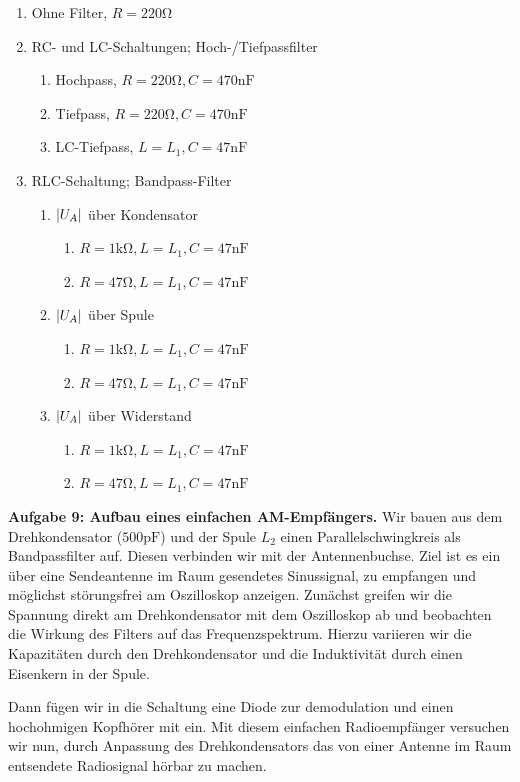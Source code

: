 \begin{multicols}{2}
  \begin{enumerate}[label=\arabic*.]
    \item Ohne Filter, $R = 220 \si{\ohm}$
    \item RC- und LC-Schaltungen; Hoch-/Tiefpassfilter
    \begin{enumerate}[label=\alph*)]
      \item Hochpass, $R = 220 \si{\ohm}, C = 470 \si{\nano\farad}$
      \item Tiefpass, $R = 220 \si{\ohm}, C = 470 \si{\nano\farad}$
      \item LC-Tiefpass, $L = L_1, C = 47 \si{\nano\farad}$
    \end{enumerate}
    \item RLC-Schaltung; Bandpass-Filter
    \begin{enumerate}[label=\alph*)]
      \item $\qty|U_A|$ über Kondensator
      \begin{enumerate}
        \item $R = 1 \si{\kilo\ohm}, L = L_1, C = 47 \si{\nano\farad}$
        \item $R = 47 \si{\ohm}, L = L_1, C = 47 \si{\nano\farad}$
      \end{enumerate}
      \item $\qty|U_A|$ über Spule
      \begin{enumerate}
        \item $R = 1 \si{\kilo\ohm}, L = L_1, C = 47 \si{\nano\farad}$
        \item $R = 47 \si{\ohm}, L = L_1, C = 47 \si{\nano\farad}$
      \end{enumerate}
      \item $\qty|U_A|$ über Widerstand
      \begin{enumerate}
        \item $R = 1 \si{\kilo\ohm}, L = L_1, C = 47 \si{\nano\farad}$
        \item $R = 47 \si{\ohm}, L = L_1, C = 47 \si{\nano\farad}$
      \end{enumerate}
    \end{enumerate}
  \end{enumerate}
  \vspace*{5em}
\end{multicols}

\newpage

\textbf{Aufgabe 9: Aufbau eines einfachen AM-Empfängers.} Wir bauen aus dem Drehkondensator ($500\si{\pico\farad}$) und der Spule $L_2$ einen Parallelschwingkreis als Bandpassfilter auf. Diesen verbinden wir mit der Antennenbuchse. Ziel ist es ein über eine Sendeantenne im Raum gesendetes Sinussignal, zu empfangen und möglichst störungsfrei am Oszilloskop anzeigen. Zunächst greifen wir die Spannung direkt am Drehkondensator mit dem Oszilloskop ab und beobachten die Wirkung des Filters auf das Frequenzspektrum. Hierzu variieren wir die Kapazitäten durch den Drehkondensator und die Induktivität durch einen Eisenkern in der Spule.

Dann fügen wir in die Schaltung eine Diode zur demodulation und einen hochohmigen Kopfhörer mit ein. Mit diesem einfachen Radioempfänger versuchen wir nun, durch Anpassung des Drehkondensators das von einer Antenne im Raum entsendete Radiosignal hörbar zu machen.
